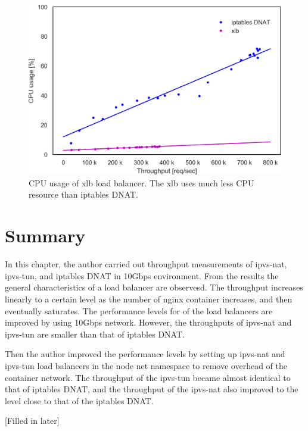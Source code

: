 \begin{figure}[h]
  \centering
  \includegraphics[width=0.8\columnwidth]{Figs/cpu_usage_10g_xlb}
  \par\bigskip
  \centering
  \begin{minipage}{0.9\columnwidth}
    \caption[CPU usage of xlb load balancer]{
      CPU usage of xlb load balancer.
      The xlb uses much less CPU resource than iptables DNAT.
    }
    \label{fig:cpu_usage_10g_xlb}
  \end{minipage}
\end{figure}

\FloatBarrier

\section{Summary}

In this chapter, the author carried out throughput measurements of ipvs-nat, ipvs-tun, and iptables DNAT in 10Gbps environment.
From the results the general characteristics of a load balancer are observesd.
The throughput increases linearly to a certain level as the number of nginx container increases, and then eventually saturates.
The performance levels for of the load balancers are improved by using 10Gbps network.
However, the throughputs of ipvs-nat and ipvs-tun are smaller than that of iptables DNAT.

Then the author improved the performance levels by setting up ipvs-nat and ipvs-tun load balancers in the node net namespace to remove overhead of the container network.
The throughput of the ipvs-tun became almost identical to that of iptables DNAT, and the throughput of the ipvs-nat also improved to the level close to that of the iptables DNAT.

[Filled in later]



